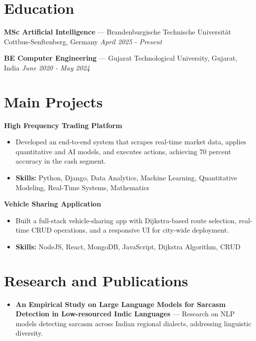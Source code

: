 \documentclass[a4paper,10pt]{article}
\begin{document}
\section*{Education}
\textbf{MSc Artificial Intelligence} — Brandenburgische Technische Universität Cottbus-Senftenberg, Germany \hfill \textit{April 2025 - Present}\par
\vspace{1.5pt}
\textbf{BE Computer Engineering} — Gujarat Technological University, Gujarat, India \hfill \textit{June 2020 - May 2024}\par

\section*{Main Projects}
\textbf{High Frequency Trading Platform}\par
\vspace{1pt}
\begin{itemize}
  \item Developed an end-to-end system that scrapes real-time market data, applies quantitative and AI models, and executes actions, achieving 70 percent accuracy in the cash segment.
  \item \textbf{Skills:} Python, Django, Data Analytics, Machine Learning, Quantitative Modeling, Real-Time Systems, Mathematics
\end{itemize}
\vspace{3pt}
\textbf{Vehicle Sharing Application}\par
\vspace{1pt}
\begin{itemize}
  \item Built a full-stack vehicle-sharing app with Dijkstra-based route selection, real-time CRUD operations, and a responsive UI for city-wide deployment.
  \item \textbf{Skills:} NodeJS, React, MongoDB, JavaScript, Dijkstra Algorithm, CRUD
\end{itemize}

\section*{Research and Publications}
\begin{itemize}
\item \textbf{An Empirical Study on Large Language Models for Sarcasm Detection in Low-resourced Indic Languages} — Research on NLP models detecting sarcasm across Indian regional dialects, addressing linguistic diversity.
\end{itemize}
\end{document}
